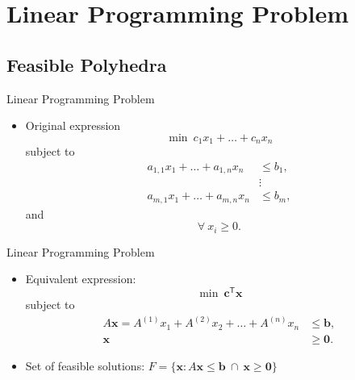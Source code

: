 \documentclass[aspectratio=169,hyperref,UTF8,CJK]{beamer}
\newcommand{\trans}{\mathsf{T}}
\newcommand{\vect}[1]{\boldsymbol{#1}}
\begin{document}
\section{Linear Programming Problem}
\subsection{Feasible Polyhedra}

\begin{frame}{Linear Programming Problem}
  \begin{itemize}
    \item Original expression
      \begin{equation*}
        \min\ c_1x_1+\ldots+c_nx_n
      \end{equation*}
      subject to
      \begin{align*}
        a_{1,1}x_1+\ldots+a_{1,n}x_n&\le b_1,\\
        &\vdots\\
        a_{m,1}x_1+\ldots+a_{m,n}x_n&\le b_m,
      \end{align*}
      and
      \begin{equation*}
        \forall\ x_i\ge0.
      \end{equation*}
  \end{itemize}
\end{frame}

\begin{frame}{Linear Programming Problem}
  \begin{itemize}
    \item Equivalent expression:
      \begin{equation*}
        \min\ \vect{c}^{\trans}\vect{x}
      \end{equation*}
      subject to
      \begin{align*}
        A\vect{x}=A^{(1)}x_1+A^{(2)}x_2+\ldots+A^{(n)}x_n&\le\vect{b},\\
        \vect{x}&\ge\vect{0}.
      \end{align*}
    \item Set of feasible solutions: $F=\{\vect{x}:A\vect{x}\le\vect{b}\ \cap\ \vect{x}\ge\vect{0}\}$
  \end{itemize}
\end{frame}
\end{document}
